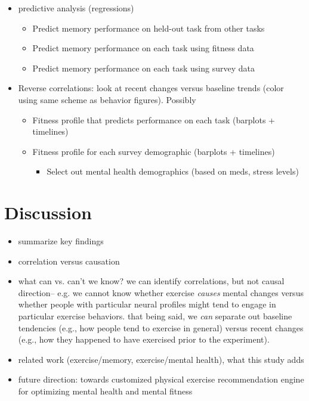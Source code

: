 \documentclass[10pt]{article}
\begin{document}
\begin{itemize}
  \item predictive analysis (regressions)
    \begin{itemize}
    \item Predict memory performance on held-out task from other tasks
    \item Predict memory performance on each task using fitness data
      \item Predict memory performance on each task using survey data
      \end{itemize}
    \item Reverse correlations: look at recent changes versus baseline
      trends (color using same scheme as behavior figures).  Possibly 
      \begin{itemize}
      \item Fitness profile that predicts performance on each task (barplots + timelines)
      \item Fitness profile for each survey demographic (barplots + timelines)
        \begin{itemize}
          \item Select out mental health demographics (based on meds, stress levels)
          \end{itemize}
        \end{itemize}
  \end{itemize}

  \section*{Discussion}
  \begin{itemize}
  \item summarize key findings
  \item correlation versus causation
         \item what can vs. can't we know?  we can identify correlations, but not causal direction-- e.g. we cannot know whether exercise \textit{causes} mental changes versus whether people with particular neural profiles might tend to engage in particular exercise behaviors.  that being said, we \textit{can} separate out baseline tendencies (e.g., how people tend to exercise in general) versus recent changes (e.g., how they happened to have exercised prior to the experiment).
  \item related work (exercise/memory, exercise/mental health), what this study adds
    \item future direction: towards customized physical exercise recommendation engine for optimizing mental health and mental fitness
    \end{itemize}
\end{document}
